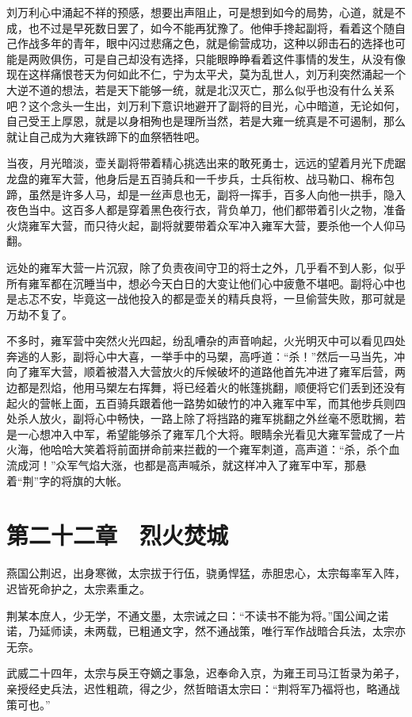 刘万利心中涌起不祥的预感，想要出声阻止，可是想到如今的局势，心道，就是不成，也不过是早死数日罢了，如今不能再犹豫了。他伸手搀起副将，看着这个随自己作战多年的青年，眼中闪过悲痛之色，就是偷营成功，这种以卵击石的选择也可能是两败俱伤，可是自己却没有选择，只能眼睁睁看着这件事情的发生，从没有像现在这样痛恨苍天为何如此不仁，宁为太平犬，莫为乱世人，刘万利突然涌起一个大逆不道的想法，若是天下能够一统，就是北汉灭亡，那么似乎也没有什么关系吧？这个念头一生出，刘万利下意识地避开了副将的目光，心中暗道，无论如何，自己受王上厚恩，就是以身相殉也是理所当然，若是大雍一统真是不可遏制，那么就让自己成为大雍铁蹄下的血祭牺牲吧。

当夜，月光暗淡，壶关副将带着精心挑选出来的敢死勇士，远远的望着月光下虎踞龙盘的雍军大营，他身后是五百骑兵和一千步兵，士兵衔枚、战马勒口、棉布包蹄，虽然是许多人马，却是一丝声息也无，副将一挥手，百多人向他一拱手，隐入夜色当中。这百多人都是穿着黑色夜行衣，背负单刀，他们都带着引火之物，准备火烧雍军大营，而只待火起，副将就要带着众军冲入雍军大营，要杀他一个人仰马翻。

远处的雍军大营一片沉寂，除了负责夜间守卫的将士之外，几乎看不到人影，似乎所有雍军都在沉睡当中，想必今天白日的大变让他们心中疲惫不堪吧。副将心中也是忐忑不安，毕竟这一战他投入的都是壶关的精兵良将，一旦偷营失败，那可就是万劫不复了。

不多时，雍军营中突然火光四起，纷乱嘈杂的声音响起，火光明灭中可以看见四处奔逃的人影，副将心中大喜，一举手中的马槊，高呼道：“杀！”然后一马当先，冲向了雍军大营，顺着被潜入大营放火的斥候破坏的道路他首先冲进了雍军后营，两边都是烈焰，他用马槊左右挥舞，将已经着火的帐篷挑翻，顺便将它们丢到还没有起火的营帐上面，五百骑兵跟着他一路势如破竹的冲入雍军中军，而其他步兵则四处杀人放火，副将心中畅快，一路上除了将挡路的雍军挑翻之外丝毫不愿耽搁，若是一心想冲入中军，希望能够杀了雍军几个大将。眼睛余光看见大雍军营成了一片火海，他哈哈大笑着将前面拼命前来拦截的一个雍军刺道，高声道：“杀，杀个血流成河！”众军气焰大涨，也都是高声喊杀，就这样冲入了雍军中军，那悬着“荆”字的将旗的大帐。

\chapter{第二十二章　烈火焚城}

燕国公荆迟，出身寒微，太宗拔于行伍，骁勇悍猛，赤胆忠心，太宗每率军入阵，迟皆死命护之，太宗素重之。

荆某本庶人，少无学，不通文墨，太宗诫之曰：“不读书不能为将。”国公闻之诺诺，乃延师读，未两载，已粗通文字，然不通战策，唯行军作战暗合兵法，太宗亦无奈。

武威二十四年，太宗与戾王夺嫡之事急，迟奉命入京，为雍王司马江哲录为弟子，亲授经史兵法，迟性粗疏，得之少，然哲暗语太宗曰：“荆将军乃福将也，略通战策可也。”

